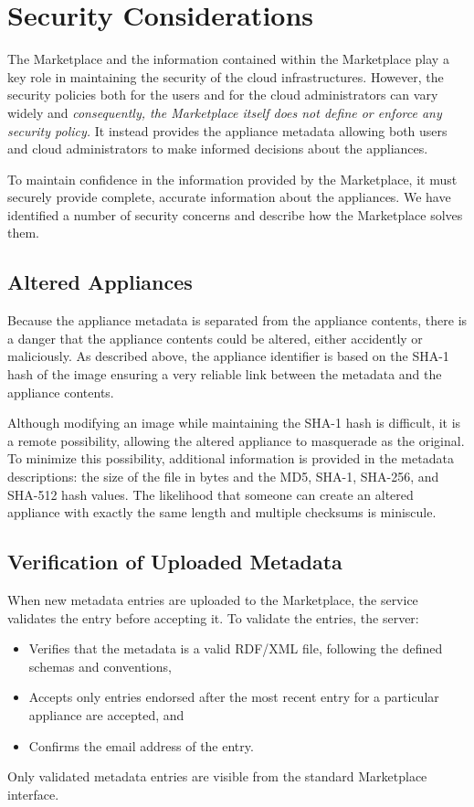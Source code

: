 \section{Security Considerations}
\label{sec:security}

The Marketplace and the information contained within the Marketplace
play a key role in maintaining the security of the cloud
infrastructures.  However, the security policies both for the users
and for the cloud administrators can vary widely and {\em
  consequently, the Marketplace itself does not define or enforce any
  security policy.}  It instead provides the appliance metadata
allowing both users and cloud administrators to make informed
decisions about the appliances.

To maintain confidence in the information provided by the Marketplace,
it must securely provide complete, accurate information about the
appliances.  We have identified a number of security concerns and
describe how the Marketplace solves them. 

\subsection{Altered Appliances}

Because the appliance metadata is separated from the appliance
contents, there is a danger that the appliance contents could be
altered, either accidently or maliciously.  As described above,
the appliance identifier is based on the SHA-1 hash of the image
ensuring a very reliable link between the metadata and the
appliance contents.

Although modifying an image while maintaining the SHA-1 hash is
difficult, it is a remote possibility, allowing the altered appliance
to masquerade as the original.  To minimize this possibility,
additional information is provided in the metadata descriptions: the
size of the file in bytes and the MD5, SHA-1, SHA-256, and SHA-512
hash values.  The likelihood that someone can create an altered
appliance with exactly the same length and multiple checksums is
miniscule.

\subsection{Verification of Uploaded Metadata}

When new metadata entries are uploaded to the Marketplace, the service
validates the entry before accepting it.  To validate the entries, the server:
\begin{itemize}
\item Verifies that the metadata is a valid RDF/XML file, following
  the defined schemas and conventions,
\item Accepts only entries endorsed after the most recent entry for a
  particular appliance are accepted, and 
\item Confirms the email address of the entry.
\end{itemize}
Only validated metadata entries are visible from the standard
Marketplace interface.

